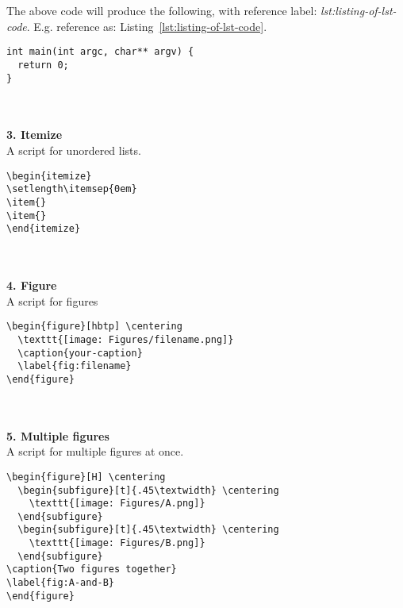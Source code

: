The above code will produce the following, with reference label: \textit{lst:listing-of-lst-code}. E.g. reference as: Listing~\ref{lst:listing-of-lst-code}.
\lstset{language=c}
\lstset{basicstyle=\footnotesize\ttfamily}
\begin{lstlisting}[caption={This is a listing of C code with caption at the top.},captionpos=t,label={lst:listing-of-lst-code}]
int main(int argc, char** argv) {
  return 0;
}
\end{lstlisting}
~\\ \\ %
\textbf{3. Itemize} \\
A script for unordered lists.
\lstset{language=tex}
\lstset{basicstyle=\small\ttfamily}
\begin{lstlisting}
\begin{itemize}
\setlength\itemsep{0em}
\item{}
\item{}
\end{itemize}
\end{lstlisting}
~\\ \\ %
\newpage
\textbf{4. Figure} \\
A script for figures
\begin{lstlisting}
\begin{figure}[hbtp] \centering
  \texttt{[image: Figures/filename.png]}
  \caption{your-caption}
  \label{fig:filename}
\end{figure}
\end{lstlisting}
~\\ \\ %
\textbf{5. Multiple figures} \\
A script for multiple figures at once.
\begin{lstlisting}
\begin{figure}[H] \centering
  \begin{subfigure}[t]{.45\textwidth} \centering
    \texttt{[image: Figures/A.png]}
  \end{subfigure}
  \begin{subfigure}[t]{.45\textwidth} \centering
    \texttt{[image: Figures/B.png]}
  \end{subfigure}
\caption{Two figures together}
\label{fig:A-and-B}
\end{figure}
\end{lstlisting}
